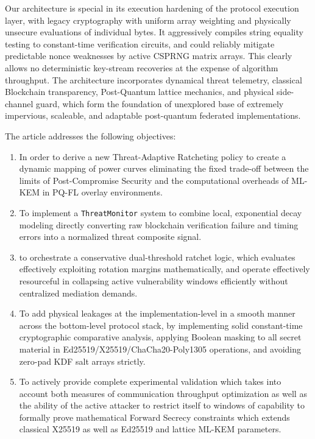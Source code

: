 \documentclass[journal, 10pt, twocolumn]{IEEEtran}
\begin{document}
Our architecture is special in its execution hardening of the protocol execution layer, with legacy cryptography with uniform array weighting and physically unsecure evaluations of individual bytes. It aggressively compiles string equality testing to constant-time verification circuits, and could reliably mitigate predictable nonce weaknesses by active CSPRNG matrix arrays. This clearly allows no deterministic key-stream recoveries at the expense of algorithm throughput. The architecture incorporates dynamical threat telemetry, classical Blockchain transparency, Post-Quantum lattice mechanics, and physical side-channel guard, which form the foundation of unexplored base of extremely impervious, scaleable, and adaptable post-quantum federated implementations.

The article addresses the following objectives:
\begin{enumerate}
\item In order to derive a new Threat-Adaptive Ratcheting policy to create a dynamic mapping of power curves eliminating the fixed trade-off between the limits of Post-Compromise Security and the computational overheads of ML-KEM in PQ-FL overlay environments.
\item To implement a \texttt{ThreatMonitor} system to combine local, exponential decay modeling directly converting raw blockchain verification failure and timing errors into a normalized threat composite signal.
\item to orchestrate a conservative dual-threshold ratchet logic, which evaluates effectively exploiting rotation margins mathematically, and operate effectively resourceful in collapsing active vulnerability windows efficiently without centralized mediation demands.
\item To add physical leakages at the implementation-level in a smooth manner across the bottom-level protocol stack, by implementing solid constant-time cryptographic comparative analysis, applying Boolean masking to all secret material in Ed25519/X25519/ChaCha20-Poly1305 operations, and avoiding zero-pad KDF salt arrays strictly.
\item To actively provide complete experimental validation which takes into account both measures of communication throughput optimization as well as the ability of the active attacker to restrict itself to windows of capability to formally prove mathematical Forward Secrecy constraints which extends classical X25519 as well as Ed25519 and lattice ML-KEM parameters.
\end{enumerate}
\end{document}

